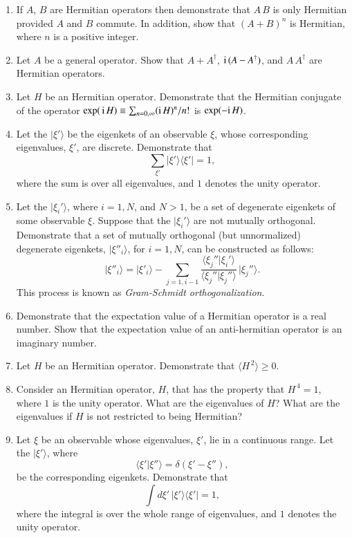 \begin{enumerate}[label=\thechapter.\arabic*,leftmargin=*,widest=9.20]
\item If $A$, $B$ are Hermitian operators then demonstrate that $A\,B$ is only Hermitian provided $A$ and $B$ commute. In addition, show that $(A+B)^n$ is Hermitian, where $n$ is a positive integer. 

\item Let $A$ be a general operator. Show that $A+A^\dag$, ${\rm i}\,(A-A^\dag)$, and $A\,A^\dag$ are Hermitian operators.

\item Let $H$ be an Hermitian operator. Demonstrate that the Hermitian conjugate of the operator $\exp(\,{\rm i}\,H)\equiv\sum_{n=0,\infty}
({\rm i}\,H)^n/n!$ is $\exp(-{\rm i}\,H)$. 

\item Let the $|\xi'\rangle$ be the eigenkets of an observable $\xi$, whose corresponding eigenvalues, $\xi'$, are discrete. 
Demonstrate that
$$
\sum_{\xi'} |\xi'\rangle\langle \xi'| = 1,
$$
where the sum is over all eigenvalues, and $1$ denotes the unity operator. 

\item Let the $|\xi_i'\rangle$, where $i=1,N$, and $N>1$, be a set of  degenerate eigenkets of some
observable $\xi$. Suppose that the $|\xi_i'\rangle$ are not mutually orthogonal. Demonstrate that a set of
mutually orthogonal (but unnormalized) degenerate  eigenkets, $|\xi''_i\rangle$, for $i=1,N$,  can be constructed as follows:
$$
|\xi''_i\rangle = |\xi'_i\rangle - \sum_{j=1,i-1}\frac{\langle\xi_j''|\xi_i'\rangle}{\langle \xi_j''|\xi_j''\rangle}\,|\xi_j''\rangle.
$$
This process is known as {\em Gram-Schmidt orthogonalization}. 

\item Demonstrate that the expectation value of a Hermitian operator is a real number. Show that the
expectation value of an anti-hermitian operator is an imaginary number. 

\item Let $H$ be an Hermitian operator. Demonstrate that $\langle H^{\,2}\rangle \geq 0$. 

\item Consider an Hermitian operator, $H$, that has the property that $H^{\,4}=1$, where $1$ is the unity
operator. What are the eigenvalues of $H$? What are the eigenvalues if $H$ is not restricted to
being Hermitian?

\item Let $\xi$ be an observable whose eigenvalues, $\xi'$, lie in a continuous range. Let the $|\xi'\rangle$, where
$$
\langle \xi'|\xi''\rangle = \delta(\xi'-\xi''),
$$
be the corresponding eigenkets. Demonstrate that
$$
\int d\xi'\, |\xi'\rangle\langle \xi'|= 1,
$$
where the integral is over the whole range of eigenvalues, and $1$ denotes the unity operator. 

\end{enumerate}
